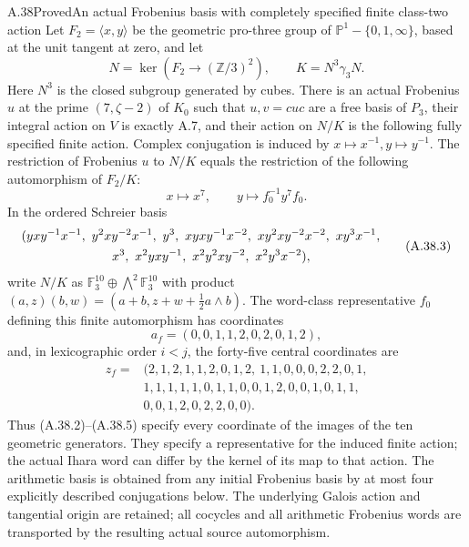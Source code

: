 \begin{statement}{A.38}{Proved}{An actual Frobenius basis with completely specified finite class-two action}
Let $F_2=\langle x,y\rangle$ be the geometric pro-three group of
$\mathbb P^1-\{0,1,\infty\}$, based at the unit tangent at zero,
and let
\[
 N=\ker(F_2\longrightarrow(\mathbb Z/3)^2),\qquad
 K=N^3\gamma_3N.
 \tag{A.38.1}
\]
Here $N^3$ is the closed subgroup generated by cubes. There is
an actual Frobenius $u$ at the prime $(7,\zeta-2)$ of $K_0$ such
that $u,v=cuc$ are a free basis of $P_3$, their integral action
on $V$ is exactly A.7, and their action on $N/K$ is the following
fully specified finite action. Complex conjugation is induced by
$x\mapsto x^{-1},y\mapsto y^{-1}$. The restriction of Frobenius
$u$ to $N/K$ equals the restriction of the following
automorphism of $F_2/K$:
\[
 x\longmapsto x^7,\qquad y\longmapsto f_0^{-1}y^7f_0.
 \tag{A.38.2}
\]
In the ordered Schreier basis
\[
\begin{split}
 &(yxy^{-1}x^{-1},\ y^2xy^{-2}x^{-1},\ y^3,\
 xyxy^{-1}x^{-2},\ xy^2xy^{-2}x^{-2},\ xy^3x^{-1},\\
 &\hspace{25mm}x^3,\ x^2yxy^{-1},\ x^2y^2xy^{-2},\
 x^2y^3x^{-2}),
\end{split}
 \tag{A.38.3}
\]
write $N/K$ as $\mathbb F_3^{10}\oplus\bigwedge^2\mathbb F_3^{10}$
with product $(a,z)(b,w)=(a+b,z+w+\tfrac12a\wedge b)$.
The word-class representative $f_0$ defining this finite
automorphism has coordinates
\[
 a_f=(0,0,1,1,2,0,2,0,1,2),
 \tag{A.38.4}
\]
and, in lexicographic order $i<j$, the forty-five central
coordinates are
\[
\begin{split}
 z_f={}&(2,1,2,1,1,2,0,1,2,\ 1,1,0,0,0,2,2,0,1,\\
       &1,1,1,1,1,0,1,1,0,0,1,2,0,0,1,0,1,1,\\
       &0,0,1,2,0,2,2,0,0).
\end{split}
 \tag{A.38.5}
\]
Thus (A.38.2)--(A.38.5) specify every coordinate of the images
of the ten geometric generators. They specify a representative
for the induced finite action; the actual Ihara word can differ
by the kernel of its map to that action. The arithmetic basis
is obtained from any initial
Frobenius basis by at most four explicitly described conjugations
below. The underlying Galois action and tangential origin are
retained; all cocycles and all arithmetic Frobenius words are
transported by the resulting actual source automorphism.
\end{statement}
